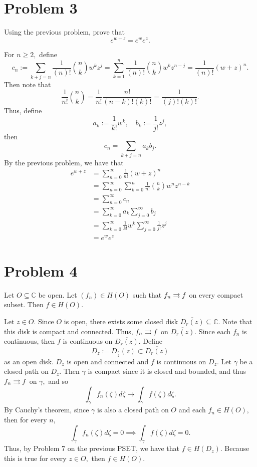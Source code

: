 \documentclass[11pt]{article}
\newcommand{\bbC}{\mathbb{C}}
\begin{document}
\newpage
\section*{Problem 3}
\begin{problem}
    Using the previous problem, prove that 
    \[e^{w + z} = e^{w} e^{z}.\]
\end{problem}
\begin{solution}
For $n\geq 2,$ define 
\[c_n := \sum_{k + j = n}\frac{1}{(n)!}\binom{n}{k}w^k z^{j} = \sum_{k=1}^{n}\frac{1}{(n)!}\binom{n}{k}w^k z^{n-j} = \frac{1}{(n)!}(w + z)^{n}.\] Then note that 
\[\frac{1}{n!}\binom{n}{k} = \frac{1}{n!}\frac{n!}{(n-k)! (k)!} = \frac{1}{(j)! (k)!}.\] Thus, define 
\[a_k := \frac{1}{k!}w^k, \quad b_k := \frac{1}{j!}z^j,\] then 
\[c_n = \sum_{k +j = n} a_k b_j.\] By the previous problem, we have that 
\begin{align*}
e^{w + z} &= \sum_{n=0}^\infty \frac{1}{n!}(w + z)^n\\ &= \sum_{n=0}^\infty \sum_{k=0}^{n} \frac{1}{n!}\binom{n}{k} w^n z^{n-k}\\ &= \sum_{n=0}^\infty c_n\\ &= \sum_{k=0}^\infty a_k \sum_{j=0}^\infty b_j\\
&= \sum_{k=0}^\infty \frac{1}{k!}w^k \sum_{j=0}^\infty \frac{1}{j!}z^j\\
&= e^we^z
\end{align*}

\end{solution}
\newpage
\section*{Problem 4}
\begin{problem}
    Let $O \subseteq \bbC$ be open. Let $(f_n) \in H(O)$ such that $f_n \overset{}{\rightrightarrows} f$ on every compact subset. Then $f\in H(O).$
\end{problem}
\begin{solution}
    Let $z\in O.$ Since $O$ is open, there exists some closed disk $ \overline{D_r(z)} \subseteq \bbC.$ Note that this disk is compact and connected. Thus, $f_n \overset{}{\rightrightarrows} f$ on $\overline{D_r(z)}.$ Since each $f_n$ is continuous, then $f$ is continuous on $\overline{D_r(z)}.$ Define \[D_z := D_{\frac{r}{2}}(z) \subset \overline{D_r(z)}\] as an open disk. $D_z$ is open and connected and $f$ is continuous on $D_z.$ Let $\gamma$ be a closed path on $D_z.$ Then $\gamma$ is compact since it is closed and bounded, and thus $f_n \overset{}{\rightrightarrows} f$ on $\gamma,$ and so 
    \[\int_\gamma f_n(\zeta)d\zeta \to \int_\gamma f(\zeta)d\zeta.\] By Cauchy's theorem, since $\gamma$ is also a closed path on $O$ and each $f_n \in H(O),$ then for every $n,$ 
    \[\int_\gamma f_n(\zeta)d\zeta = 0\implies \int_\gamma f(\zeta)d\zeta = 0.\] Thus, by Problem 7 on the previous PSET, we have that $f\in H(D_z).$ Because this is true for every $z\in O,$ then $f\in H(O).$
\end{solution}

\newpage
\end{document}
